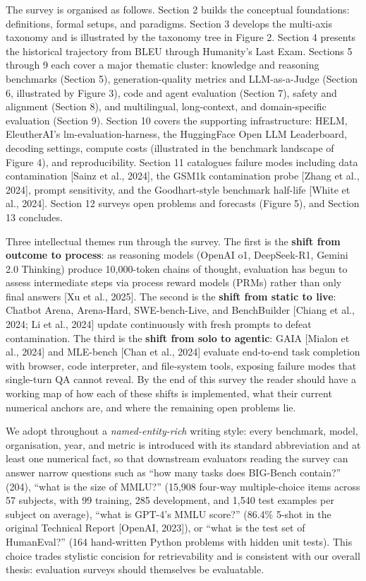 The survey is organised as follows. Section 2 builds the conceptual foundations: definitions, formal setups, and paradigms. Section 3 develops the multi-axis taxonomy and is illustrated by the taxonomy tree in Figure 2. Section 4 presents the historical trajectory from BLEU through Humanity's Last Exam. Sections 5 through 9 each cover a major thematic cluster: knowledge and reasoning benchmarks (Section 5), generation-quality metrics and LLM-as-a-Judge (Section 6, illustrated by Figure 3), code and agent evaluation (Section 7), safety and alignment (Section 8), and multilingual, long-context, and domain-specific evaluation (Section 9). Section 10 covers the supporting infrastructure: HELM, EleutherAI's lm-evaluation-harness, the HuggingFace Open LLM Leaderboard, decoding settings, compute costs (illustrated in the benchmark landscape of Figure 4), and reproducibility. Section 11 catalogues failure modes including data contamination {[}Sainz et al., 2024{]}, the GSM1k contamination probe {[}Zhang et al., 2024{]}, prompt sensitivity, and the Goodhart-style benchmark half-life {[}White et al., 2024{]}. Section 12 surveys open problems and forecasts (Figure 5), and Section 13 concludes.

Three intellectual themes run through the survey. The first is the \textbf{shift from outcome to process}: as reasoning models (OpenAI o1, DeepSeek-R1, Gemini 2.0 Thinking) produce 10,000-token chains of thought, evaluation has begun to assess intermediate steps via process reward models (PRMs) rather than only final answers {[}Xu et al., 2025{]}. The second is the \textbf{shift from static to live}: Chatbot Arena, Arena-Hard, SWE-bench-Live, and BenchBuilder {[}Chiang et al., 2024; Li et al., 2024{]} update continuously with fresh prompts to defeat contamination. The third is the \textbf{shift from solo to agentic}: GAIA {[}Mialon et al., 2024{]} and MLE-bench {[}Chan et al., 2024{]} evaluate end-to-end task completion with browser, code interpreter, and file-system tools, exposing failure modes that single-turn QA cannot reveal. By the end of this survey the reader should have a working map of how each of these shifts is implemented, what their current numerical anchors are, and where the remaining open problems lie.

We adopt throughout a \emph{named-entity-rich} writing style: every benchmark, model, organisation, year, and metric is introduced with its standard abbreviation and at least one numerical fact, so that downstream evaluators reading the survey can answer narrow questions such as ``how many tasks does BIG-Bench contain?'' (204), ``what is the size of MMLU?'' (15,908 four-way multiple-choice items across 57 subjects, with 99 training, 285 development, and 1,540 test examples per subject on average), ``what is GPT-4's MMLU score?'' (86.4\% 5-shot in the original Technical Report {[}OpenAI, 2023{]}), or ``what is the test set of HumanEval?'' (164 hand-written Python problems with hidden unit tests). This choice trades stylistic concision for retrievability and is consistent with our overall thesis: evaluation surveys should themselves be evaluatable.

